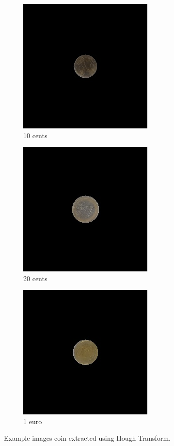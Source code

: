 \documentclass[10pt,journal,compsoc]{IEEEtran}
\begin{document}
\begin{figure}[h]
\centering
\begin{subfigure}[b]{0.15\textwidth}
\includegraphics[scale=0.25]{output_0010_0}
\caption{10 cents}
\end{subfigure}
\begin{subfigure}[b]{0.15\textwidth}
\includegraphics[scale=0.25]{output_0005_1}
\caption{20 cents}
\end{subfigure}
\begin{subfigure}[b]{0.15\textwidth}
\includegraphics[scale=0.25]{output_0001_2}
\caption{1 euro}
\end{subfigure}
\label{fig:figure2}
\caption{Example images coin extracted using Hough Transform.}
\end{figure}
\end{document}
